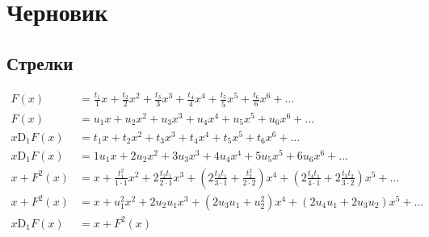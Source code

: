 
\chapter{Черновик}

\section{Стрелки}

\begin{equation*}
\begin{aligned}
F(x) &=
  \frac{t_1}{1} x 
+ \frac{t_2}{2} x^2
+ \frac{t_3}{3} x^3 
+ \frac{t_4}{4} x^4
+ \frac{t_5}{5} x^5 
+ \frac{t_6}{6} x^6
+ \ldots \\
%
F(x) &=
  u_1 x 
+ u_2 x^2
+ u_3 x^3 
+ u_4 x^4
+ u_5 x^5 
+ u_6 x^6
+ \ldots \\
%
x \mathrm{D}_1{F(x)} &=
  t_1 x
+ t_2 x^2
+ t_3 x^3
+ t_4 x^4
+ t_5 x^5
+ t_6 x^6
+ \ldots \\
%
x \mathrm{D}_1{F(x)} &=
  1 u_1 x
+ 2 u_2 x^2
+ 3 u_3 x^3
+ 4 u_4 x^4
+ 5 u_5 x^5
+ 6 u_6 x^6
+ \ldots \\
%
x + F^2(x) &=
  x
+ \frac{t_1^2}{1 \cdot 1} x^2 
+ 2 \frac{t_2 t_1}{2 \cdot 1} x^3 
+ \left(2 \frac{t_3 t_1}{3 \cdot 1} + \frac{t_2^2}{2 \cdot 2} \right) x^4 
+ \left(2 \frac{t_4 t_1}{4 \cdot 1} + 2 \frac{t_3 t_2}{3 \cdot 2} \right) x^5 + \ldots \\
%
x + F^2(x) &=
  x
+ u_1^2 x^2 
+ 2 u_2 u_1 x^3 
+ \left(2 u_3 u_1 + u_2^2 \right) x^4 
+ \left(2 u_4 u_1 + 2 u_3 u_2 \right) x^5
+ \ldots \\
%
x \mathrm{D}_1{F(x)} &= x + F^2(x) \\
%
\end{aligned}
\end{equation*}

